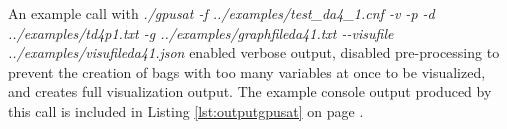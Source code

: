 \documentclass[a4paper, 12pt, bibliography=totoc]{scrartcl}
\begin{document}
%
%	
        
An example call with \textit{./gpusat -f ../examples/test\_da4\_1.cnf -v -p -d ../examples/td4p1.txt  -g ../examples/graphfileda41.txt -{}-visufile ../examples/visufileda41.json} enabled verbose output, disabled pre-processing to prevent the creation of bags with too many variables at once to be visualized, and creates full visualization output. 
The example console output produced by this call is included in Listing \ref{lst:outputgpusat} on page \pageref{lst:outputgpusat}.
\end{document}
